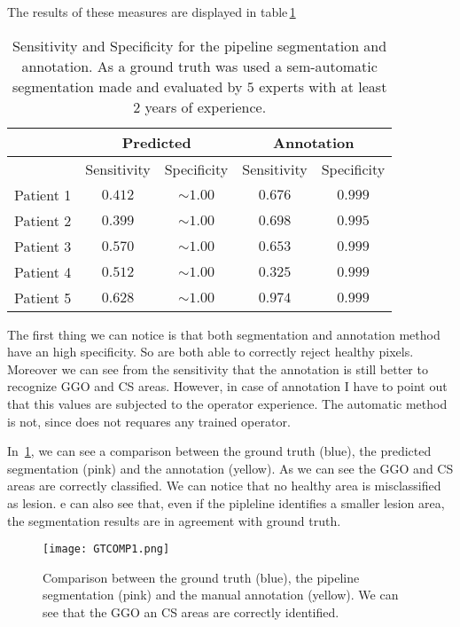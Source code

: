 \documentclass{standalone}
\begin{document}
	The results of these measures are displayed in table\,\ref{tab:Measures}
	\begin{table}[h!]
		\centering
		\begin{tabular}{|c|c|c|c|c|}
			\hline
			\multirow{2}{*}{}		  & \multicolumn{2}{c|}{Predicted} & \multicolumn{2}{c|}{Annotation} \\ \hline
						& Sensitivity & Specificity	 		& Sensitivity & Specificity		 \\ \hline
			Patient 1	& $0.412$	  &	$\sim 1.00$			&	$0.676$	  &	$ 0.999$ 		 \\ 
			Patient 2	& $0.399$	  & $\sim 1.00$ 		&	$0.698$	  & $ 0.995$		 \\
			Patient 3	& $0.570$	  &	$\sim 1.00$			&	$0.653$	  & $ 0.999$		 \\
			Patient 4	& $0.512$	  & $\sim 1.00$			&	$0.325$	  & $ 0.999$		 \\
			Patient 5 	& $0.628$	  & $\sim 1.00$			&	$0.974$	  &	$ 0.999$		 \\ \hline
		\end{tabular}\caption{Sensitivity and Specificity for the pipeline segmentation and annotation. As a ground truth was used a sem-automatic segmentation made and evaluated by $5$ experts with at least $2$ years of experience.}\label{tab:Measures}
		
	\end{table}

	The first thing we can notice is that both segmentation and annotation method have an high specificity. So are both able to correctly reject healthy pixels. Moreover we can see from the sensitivity that the annotation is still better to recognize GGO and CS areas. However, in case of annotation I have to point out that this values are subjected to the operator experience. The automatic method is not, since does not requares any trained operator.  
	
	In \figurename\,\ref{fig:conf1}, we can see a comparison between the ground truth (blue), the predicted segmentation (pink) and the annotation (yellow). As we can see the GGO and CS areas are correctly classified. We can notice that no healthy area is misclassified as lesion. e can also see that, even if the pipleline identifies a smaller lesion area, the segmentation results are in agreement with ground truth.
	
	\begin{figure}[h!]
		\texttt{[image: GTCOMP1.png]}
		
		\caption{Comparison between the ground truth (blue), the pipeline segmentation (pink) and the manual annotation (yellow). We can see that the GGO an CS areas are correctly identified.}\label{fig:conf1}
	\end{figure}
	
\end{document}
